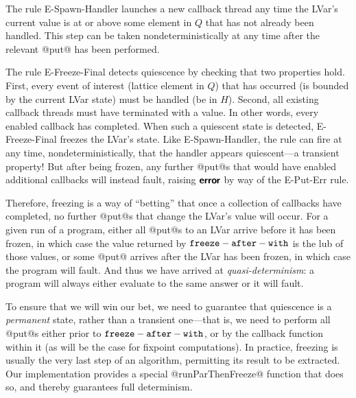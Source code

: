 The rule {\sc E-Spawn-Handler} launches a new callback thread any time
the LVar's current value is at or above some element in $Q$ that has
not already been handled.  This step can be taken nondeterministically
at any time after the relevant @put@ has been performed.

The rule {\sc E-Freeze-Final} detects quiescence by checking that two
properties hold.  First, every event of interest (lattice element in
$Q$) that has occurred (is bounded by the current LVar state) must be
handled (be in $H$).  Second, all existing callback threads must have
terminated with a value.  In other words, every enabled callback has
completed.  When such a quiescent state is detected, {\sc
  E-Freeze-Final} freezes the LVar's state.  Like {\sc
  E-Spawn-Handler}, the rule can fire at any time,
nondeterministically, that the handler appears quiescent---a transient
property!  But after being frozen, any further @put@s that would have
enabled additional callbacks will instead fault, raising $\textbf{\textsf{error}}$ by
way of the {\sc E-Put-Err} rule.  

Therefore, freezing is a way of ``betting'' that once a collection of
callbacks have completed, no further @put@s that change the LVar's
value will occur.  For a given run of a program, either all @put@s to
an LVar arrive before it has been frozen, in which case the value
returned by ${\mbox{\texttt{freeze}}-\mbox{\texttt{after}}-\mbox{\texttt{with}}}$ is the lub of those values, or some @put@ arrives
after the LVar has been frozen, in which case the program will fault.
And thus we have arrived at \emph{quasi-determinism}: a program will
always either evaluate to the same answer or it will fault.

To ensure that we will win our bet, we need to guarantee that
quiescence is a \emph{permanent} state, rather than a transient
one---that is, we need to perform all @put@s either prior to ${\mbox{\texttt{freeze}}-\mbox{\texttt{after}}-\mbox{\texttt{with}}}$,
or by the callback function within it (as will be the case for
fixpoint computations).  In practice, freezing is usually the very
last step of an algorithm, permitting its result to be extracted. Our
implementation provides a special @runParThenFreeze@ function that
does so, and thereby guarantees full determinism.
